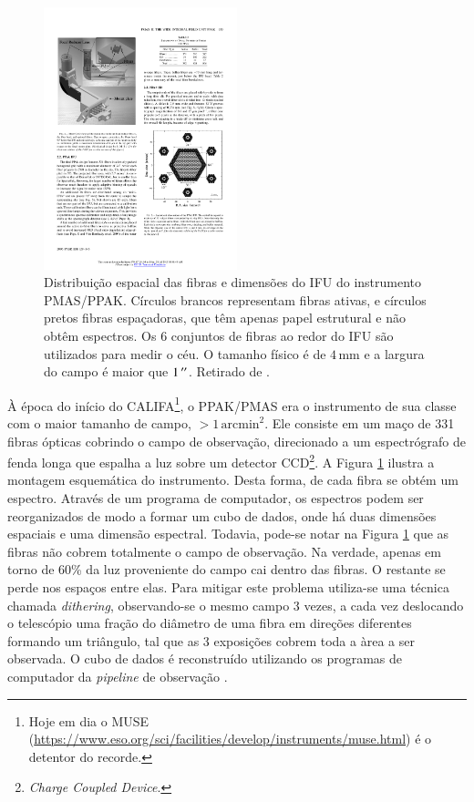 \begin{figure}
	\includegraphics[width=0.5\textwidth]{figuras/PPAK}
	\caption[Distribuição das fibras no instrumento PMAS/PPAK]
	{Distribuição espacial das fibras e dimensões do IFU do instrumento PMAS/PPAK.
	Círculos brancos representam fibras ativas, e círculos pretos fibras
	espaçadoras, que têm apenas papel estrutural e não obtêm espectros. Os 6
	conjuntos de fibras ao redor do IFU são utilizados para medir o céu. O tamanho
	físico é de $4\,\mathrm{mm}$ e a largura do campo é maior que $1\,^{\prime\prime}$.
	Retirado de	\citet{Kelz2006}.}
	\label{fig:PPAK}
\end{figure}

À época do início do CALIFA\footnote{Hoje em dia o MUSE
(\url{https://www.eso.org/sci/facilities/develop/instruments/muse.html}) é o
detentor do recorde.}, o PPAK/PMAS era o instrumento de sua classe com o maior
tamanho de campo, $>1\,\mathrm{arcmin}^2$. Ele consiste em um maço de 331 fibras
ópticas cobrindo o campo de observação, direcionado a um espectrógrafo de fenda
longa que espalha a luz sobre um detector CCD\footnote{{\em Charge Coupled
Device}.}.
A Figura \ref{fig:PPAK} ilustra a montagem esquemática do instrumento. Desta
forma, de cada fibra se obtém um espectro. Através de um programa de computador,
os espectros podem ser reorganizados de modo a formar um cubo de dados, onde há
duas dimensões espaciais e uma dimensão espectral.
Todavia, pode-se notar na Figura \ref{fig:PPAK} que as fibras não cobrem
totalmente o campo de observação. Na verdade, apenas em torno de 60\% da luz
proveniente do campo cai dentro das fibras. O restante se perde nos espaços
entre elas. Para mitigar este problema utiliza-se uma técnica chamada {\em
dithering}, observando-se o mesmo campo 3 vezes, a cada vez deslocando o
telescópio uma fração do diâmetro de uma fibra em direções diferentes formando
um triângulo, tal que as 3 exposições cobrem toda a àrea a ser observada. O cubo
de dados é reconstruído utilizando os programas de computador da {\em pipeline}
de observação \citep{Sanchez2012}.

